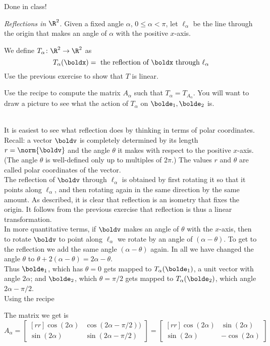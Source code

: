 \begin{solution}
Done in class! 
\end{solution}
\begin{samepage}
\ii
\label{Ex:refl} {\em Reflections in $\R^2$}. Given a fixed angle $\alpha$, $0\leq \alpha<\pi $, let $\ell_{\alpha}$ be the line through the origin that makes an angle of $\alpha$ with the positive $x$-axis. 

We define $T_{\alpha}\colon\R^2\rightarrow \R^2$ as 
\[
T_\alpha(\boldx)=\text{ the reflection of $\boldx$ through $\ell_\alpha$}
\]
\bb
\ii Use the previous exercise to show that $T$ is linear. 

\ii Use the recipe to compute the matrix $A_{\alpha}$ such that $T_\alpha=T_{A_\alpha}$.  You will want to draw a picture to see what the action of $T_\alpha$ on $\bolde_1, \bolde_2$ is. 
\ee
\end{samepage}
\begin{solution}
\ \\
It is easiest to see what reflection does by thinking in terms of polar coordinates. Recall: a vector $\boldv$ is completely determined by its length $r=\norm{\boldv}$ and the angle $\theta$ it makes with respect to the positive $x$-axis. (The angle $\theta$ is well-defined only up to multiples of $2\pi$.) The values $r$ and $\theta$ are called polar coordinates of the vector. 
\\
The reflection of $\boldv$ through $\ell_{\alpha}$ is obtained by first rotating it so that it points along $\ell_{\alpha}$, and then rotating again in the same direction by the same amount. As described, it is clear that reflection is an isometry that fixes the origin. It follows from the previous exercise that reflection is thus a linear transformation. 
\\
In more quantitative terms, 
if $\boldv$ makes an angle of $\theta$ with the $x$-axis, then to rotate $\boldv$ to point along $\ell_{\alpha}$ we rotate by an angle of $(\alpha-\theta)$. To get to the reflection we add the same angle $(\alpha-\theta)$ again. In all we have changed the angle $\theta$ to $\theta+2(\alpha-\theta)=2\alpha-\theta$. 
\\
Thus $\bolde_1$, which has $\theta=0$ gets mapped to $T_{\alpha}(\bolde_1)$, a unit vector with angle $2\alpha$; and $\bolde_2$, which $\theta=\pi/2$ gets mapped to $T_{\alpha}(\bolde_2)$, which angle $2\alpha-\pi/2$.
\\ 
Using the recipe 

The matrix we get is 
\[
A_\alpha=\begin{bmatrix}[rr]
\cos(2\alpha)&\cos(2\alpha-\pi/2))\\
\sin(2\alpha)&\sin(2\alpha-\pi/2)
\end{bmatrix}
=
\begin{bmatrix}[rr]
\cos(2\alpha)&\sin(2\alpha)\\
\sin(2\alpha)&-\cos(2\alpha)
\end{bmatrix}
\]
\end{solution}

